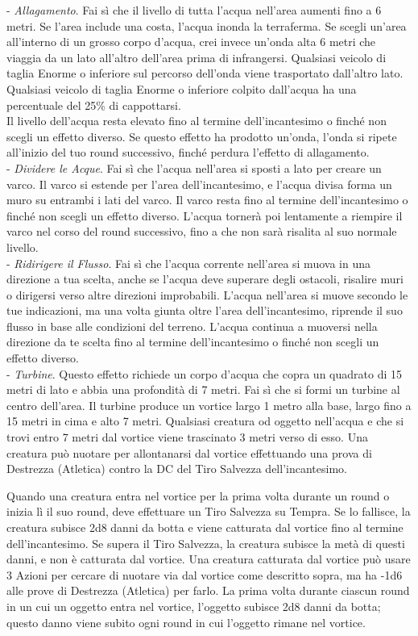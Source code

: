 \begin{multicols}{2}
- \textit{Allagamento}. Fai sì che il livello di tutta l'acqua nell'area aumenti fino a 6 metri. Se l'area include una costa, l'acqua inonda la terraferma. Se scegli un'area all'interno di un grosso corpo d'acqua, crei invece un'onda alta 6 metri che viaggia da un lato all'altro dell'area prima di infrangersi. Qualsiasi veicolo di taglia Enorme o inferiore sul percorso dell'onda viene trasportato dall'altro lato. Qualsiasi veicolo di taglia Enorme o inferiore colpito dall'acqua ha una percentuale del 25\% di cappottarsi.\\
Il livello dell'acqua resta elevato fino al termine dell'incantesimo o finché non scegli un effetto diverso. Se questo effetto ha prodotto un'onda, l'onda si ripete all'inizio del tuo round successivo, finché perdura l'effetto di allagamento.\\
- \textit{Dividere le Acque}. Fai sì che l'acqua nell'area si sposti a lato per creare un varco. Il varco si estende per l'area dell'incantesimo, e l'acqua divisa forma un muro su entrambi i lati del varco. Il varco resta fino al termine dell'incantesimo o finché non scegli un effetto diverso. L'acqua tornerà poi lentamente a riempire il varco nel corso del round successivo, fino a che non sarà risalita al suo normale livello.\\
- \textit{Ridirigere il Flusso}. Fai sì che l'acqua corrente nell'area si muova in una direzione a tua scelta, anche se l'acqua deve superare degli ostacoli, risalire muri o dirigersi verso altre direzioni improbabili. L'acqua nell'area si muove secondo le tue indicazioni, ma una volta giunta oltre l'area dell'incantesimo, riprende il suo flusso in base alle condizioni del terreno. L'acqua continua a muoversi nella direzione da te scelta fino al termine dell'incantesimo o finché non scegli un effetto diverso.\\
- \textit{Turbine}. Questo effetto richiede un corpo d'acqua che copra un quadrato di 15 metri di lato e abbia una profondità di 7 metri. Fai sì che si formi un turbine al centro dell'area. Il turbine produce un vortice largo 1 metro alla base, largo fino a 15 metri in cima e alto 7 metri. Qualsiasi creatura od oggetto nell'acqua e che si trovi entro 7 metri dal vortice viene trascinato 3 metri verso di esso. Una creatura può nuotare per allontanarsi dal vortice effettuando una prova di Destrezza (Atletica) contro la DC del Tiro Salvezza dell'incantesimo.

Quando una creatura entra nel vortice per la prima volta durante un round o inizia lì il suo round, deve effettuare un Tiro Salvezza su Tempra. Se lo fallisce, la creatura subisce 2d8 danni da botta e viene catturata dal vortice fino al termine dell'incantesimo. Se supera il Tiro Salvezza, la creatura subisce la metà di questi danni, e non è catturata dal vortice. Una creatura catturata dal vortice può usare 3 Azioni per cercare di nuotare via dal vortice come descritto sopra, ma ha -1d6 alle prove di Destrezza (Atletica) per farlo. La prima volta durante ciascun round in un cui un oggetto entra nel vortice, l'oggetto subisce 2d8 danni da botta; questo danno viene subito ogni round in cui l'oggetto rimane nel vortice.


\end{multicols}

